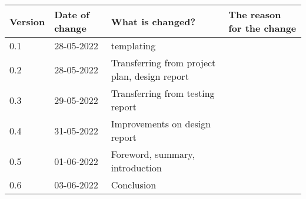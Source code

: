 \begin{tabular}{ | l | l | l | l |}
    \hline
    \textbf{Version} & \textbf{Date of change} & \textbf{What is changed?} & \textbf{The reason for the change} \\ \hline
    0.1 & 28-05-2022 & templating & \\
    0.2 & 28-05-2022 & Transferring from project plan, design report & \\
    0.3 & 29-05-2022 & Transferring from testing report & \\
    0.4 & 31-05-2022 & Improvements on design report & \\
    0.5 & 01-06-2022 & Foreword, summary, introduction & \\
    0.6 & 03-06-2022 & Conclusion & \\
    \hline
\end{tabular}
